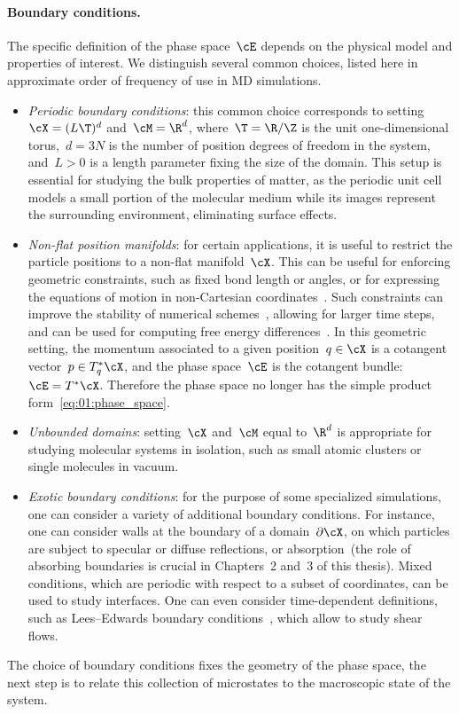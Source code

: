 \paragraph{Boundary conditions.}
The specific definition of the phase space~$\cE$ depends on the physical model and properties of interest. We distinguish several common choices,  listed here in approximate order of frequency of use in MD simulations.
\begin{itemize}
    \item{\textit{Periodic boundary conditions}: this common choice corresponds to setting~$\cX = (L\T)^d$ and~$\cM=\R^d$, where~$\T=\R/\Z$ is the unit one-dimensional torus,~$d=3N$ is the number of position degrees of freedom in the system, and~$L>0$ is a length parameter fixing the size of the domain. This setup is essential for studying the bulk properties of matter, as the periodic unit cell models a small portion of the molecular medium while its images represent the surrounding environment, eliminating surface effects.}
    \item{\textit{Non-flat position manifolds}: for certain applications, it is useful to restrict the particle positions to a non-flat manifold~$\cX$. This can be useful for enforcing geometric constraints, such as fixed bond length or angles, or for expressing the equations of motion in non-Cartesian coordinates~\cite{VJ15}. Such constraints can improve the stability of numerical schemes~\cite{RCB77,A83,BKLS95}, allowing for larger time steps, and can be used for computing free energy differences~\cite{SC98,LRS12}. In this geometric setting, the momentum associated to a given position~$q\in\cX$ is a cotangent vector~$p\in T_q^*\cX$, and the phase space~$\cE$ is the cotangent bundle:~$\cE=T^*\cX$. Therefore the phase space no longer has the simple product form~\eqref{eq:01:phase_space}.}
    \item{\textit{Unbounded domains}: setting~$\cX$ and~$\cM$ equal to~$\R^d$ is appropriate for studying molecular systems in isolation, such as small atomic clusters or single molecules in vacuum.}
    \item{\textit{Exotic boundary conditions}: for the purpose of some specialized simulations, one can consider a variety of additional boundary conditions. For instance, one can consider walls at the boundary of a domain~$\partial\cX$, on which particles are subject to specular or diffuse reflections, or absorption~(the role of absorbing boundaries is crucial in Chapters~2 and~3 of this thesis). Mixed conditions, which are periodic with respect to a subset of coordinates, can be used to study interfaces. One can even consider time-dependent definitions, such as Lees--Edwards boundary conditions~\cite{LE72}, which allow to study shear flows.}
\end{itemize}    
The choice of boundary conditions fixes the geometry of the phase space, the next step is to relate this collection of microstates to the macroscopic state of the system. 

